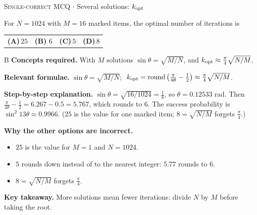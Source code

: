 \documentclass[11pt,a4paper]{article}
\newcommand{\optlabel}[1]{\textbf{(#1)}}
\newcommand{\correctlabel}[1]{\textcolor{okgreen}{\textbf{(#1)}\,\ding{51}}}
\newenvironment{qitem}[1]{\begin{list}{}{\setlength{\leftmargin}{3.3em}\setlength{\labelwidth}{3.1em}%
  \setlength{\labelsep}{0.2em}\setlength{\topsep}{3pt}\setlength{\parsep}{3pt}}\item[\textbf{Q.#1}\hfill]}{\end{list}}
\newcommand{\qsep}{\par\vspace{2pt}{\color{black!15}\hrule}\vspace{4pt}}
\newcommand{\qmeta}[2]{{\footnotesize\color{black!60}\textsc{#1} \;$\cdot$\; #2}\par}
\begin{document}
\begin{qitem}{61}
\qmeta{Single-correct MCQ}{Several solutions: $k_{\rm opt}$}
For $N = 1024$ with $M = 16$ marked items, the optimal number of iterations is
\par\smallskip\noindent\begin{tabularx}{\linewidth}{@{}*{4}{L}@{}}
\optlabel{A}\,$25$ & \correctlabel{B}\,$6$ & \optlabel{C}\,$5$ & \optlabel{D}\,$8$
\end{tabularx}
\end{qitem}
\begin{solbox}{B}
\textbf{\color{brand}Concepts required.} With $M$ solutions $\sin\theta = \sqrt{M/N}$, and $k_{\rm opt} \approx \frac\pi4\sqrt{N/M}$.

\textbf{\color{brand}Relevant formulae.} $\sin\theta = \sqrt{M/N}$; $\;k_{\rm opt} = \operatorname{round}\big(\frac{\pi}{4\theta} - \frac12\big) \approx \frac\pi4\sqrt{N/M}$.

\textbf{\color{brand}Step-by-step explanation.} $\sin\theta = \sqrt{16/1024} = \frac18$, so $\theta = 0.12533$ rad. Then $\frac{\pi}{4\theta} - \frac12 = 6.267 - 0.5 = 5.767$, which rounds to $6$. The success probability is $\sin^2 13\theta \approx 0.9966$.
($25$ is the value for one marked item; $8 = \sqrt{N/M}$ forgets $\frac\pi4$.)

\textbf{\color{brand}Why the other options are incorrect.}
\begin{itemize}[leftmargin=2.4em, itemsep=1pt, topsep=2pt]
\item[\textbf{(A)}] $25$ is the value for $M = 1$ and $N = 1024$.
\item[\textbf{(C)}] $5$ rounds down instead of to the nearest integer: $5.77$ rounds to $6$.
\item[\textbf{(D)}] $8 = \sqrt{N/M}$ forgets $\frac\pi4$.
\end{itemize}
\textbf{\color{brand}Key takeaway.} More solutions mean fewer iterations: divide $N$ by $M$ before taking the root.
\end{solbox}
\qsep
\end{document}
